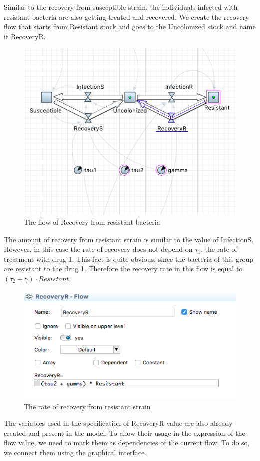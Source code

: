 Similar to the recovery from susceptible strain, the individuals infected with resistant bacteria are also getting treated and recovered. We create the recovery flow that starts from Resistant stock and goes to the Uncolonized stock and name it RecoveryR.

\begin{figure}[H]
  \centering
  \includegraphics[height=0.5\textwidth]{img/screens/recovery/recovery8}
  \caption{The flow of Recovery from resistant bacteria}
\end{figure}

The amount of recovery from resistant strain is similar to the value of InfectionS. However, in this case the rate of recovery does not depend on $\tau_1$, the rate of treatment with drug 1. This fact is quite obvious, since the bacteria of this group are resistant to the drug 1. Therefore the recovery rate in this flow is equal to $(\tau_2 + \gamma) \cdot Resistant$.

\begin{figure}[H]
  \centering
  \includegraphics[height=0.3\textwidth]{img/screens/recovery/recovery10}
  \caption{The rate of recovery from resistant strain}
\end{figure}

The variables used in the specification of RecoveryR value are also already created and present in the model. To allow their usage in the expression of the flow value, we need to mark them as dependencies of the current flow. To do so, we connect them using the graphical interface.

